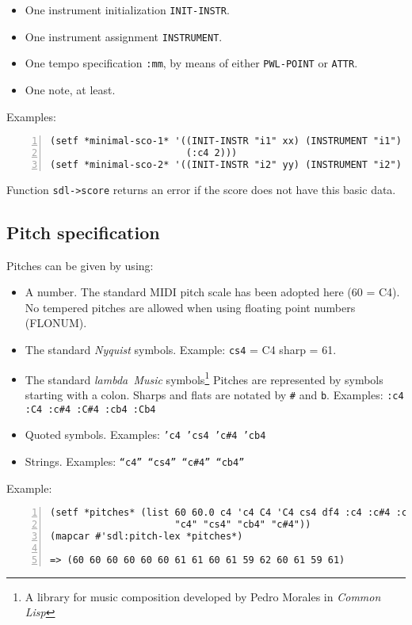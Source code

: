 \begin{itemize}
  \item One instrument initialization \texttt{INIT-INSTR}.
  \item One instrument assignment \texttt{INSTRUMENT}.
  \item One tempo specification \texttt{:mm}, by means of either \texttt{PWL-POINT} or  \texttt{ATTR}.
  \item One note, at least.
\end{itemize}
Examples:
\begin{Verbatim}[frame=single,fontsize=\small,numbers=left,numbersep=2mm]
(setf *minimal-sco-1* '((INIT-INSTR "i1" xx) (INSTRUMENT "i1") (PWL-POINT :mm 100)
                        (:c4 2)))
(setf *minimal-sco-2* '((INIT-INSTR "i2" yy) (INSTRUMENT "i2") (ATTR :mm 100) :c4))
\end{Verbatim}
Function \texttt{sdl->score} returns an error if the score does not have this basic data.

\subsection{Pitch specification}
Pitches can be given by using:

\begin{itemize}
  \item A number. The standard MIDI pitch scale has been adopted here (60 = C4). No tempered pitches are allowed when using floating point numbers (FLONUM).
  \item The standard \textit{Nyquist} symbols. Example: \texttt{cs4} = C4 sharp = 61.
  \item The standard \textit{lambda~Music} symbols\footnote{A library for music composition developed by Pedro Morales in \textit{Common Lisp}} Pitches are represented by symbols starting with a colon. Sharps and flats are notated by \texttt{\#} and \texttt{b}. Examples: \texttt{:c4 :C4 :c\#4 :C\#4 :cb4 :Cb4}
    \item Quoted symbols.  Examples: \texttt{'c4 'cs4 'c\#4 'cb4}
      \item Strings. Examples: \texttt{``c4'' ``cs4'' ``c\#4'' ``cb4''} 
\end{itemize}
Example:
\begin{Verbatim}[frame=single,fontsize=\small,numbers=left,numbersep=2mm]
(setf *pitches* (list 60 60.0 c4 'c4 C4 'C4 cs4 df4 :c4 :c#4 :cb4 :df4
                      "c4" "cs4" "cb4" "c#4"))
(mapcar #'sdl:pitch-lex *pitches*)

=> (60 60 60 60 60 60 61 61 60 61 59 62 60 61 59 61)
\end{Verbatim}

